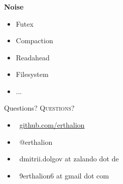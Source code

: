 \documentclass[usenames,dvipsnames, 18pt, compress, aspectratio=169]{beamer}
\def\twitter{{\FA \faTwitter}}
\def\github{{\FA \faGithub}}
\def\email{{\FA \faEnvelope}}
\begin{document}
\begin{frame}[fragile]{}
    \frametitle{}
    \begin{center}
        \textbf{Noise}

        \begin{itemize}[label={\MVRightarrow}]
			\item Futex
            \item Compaction
            \item Readahead
            \item Filesystem
            \item ...
        \end{itemize}

    \end{center}
\end{frame}

\fontsize{18pt}{18}\selectfont
\begin{frame}
  \vspace*{2.5cm}
  \begin{minipage}[b][\paperheight]{\textwidth}
  \begin{center}

      \linespread{1.0}%
      \if@noSmallCapitals%
        Questions?
      \else%
        \scshape{\color{black} Questions?}%
      \fi%
      \vspace*{0.3em}

      \fontsize{13pt}{14}\selectfont
        \begin{itemize}[label={}]
            \item {\color{black} \github\ \href{github.com/erthalion}
                                               {\color{black}github.com/erthalion}}
            \item {\color{black} \twitter\ @erthalion}
            \item {\color{black} \email\ dmitrii.dolgov at zalando dot de}
            \item {\color{black} \email\ 9erthalion6 at gmail dot com}
        \end{itemize}
      \vspace*{2.5em}%

    \vfill
    \vspace*{2em}
  \end{center}
  \end{minipage}

\end{frame}
\end{document}
